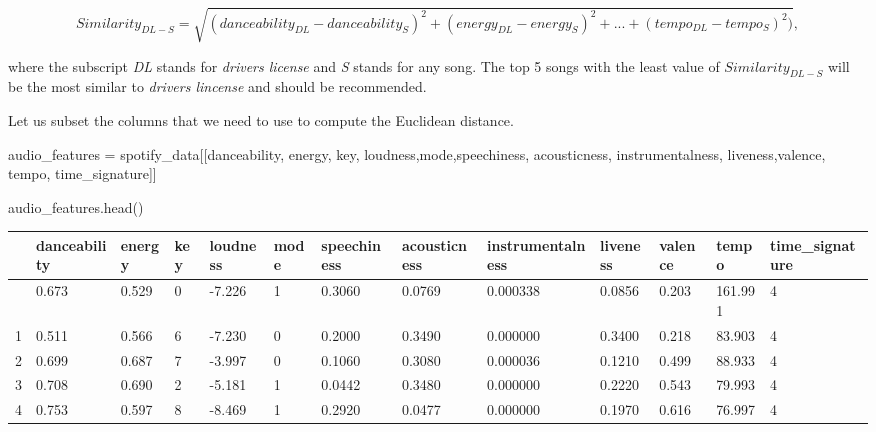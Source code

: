 \documentclass[
  letterpaper,
  DIV=11,
  numbers=noendperiod]{scrreprt}
\newenvironment{Shaded}{\begin{snugshade}}{\end{snugshade}}
\newcommand{\NormalTok}[1]{\textcolor[rgb]{0.00,0.23,0.31}{#1}}
\newcommand{\OperatorTok}[1]{\textcolor[rgb]{0.37,0.37,0.37}{#1}}
\newcommand{\StringTok}[1]{\textcolor[rgb]{0.13,0.47,0.30}{#1}}
\begin{document}
\[Similarity_{DL-S} = \sqrt{(danceability_{DL}-danceability_{S})^2+(energy_{DL}-energy_{S})^2 +...+ (tempo_{DL}-tempo_{S})^2)},\]

where the subscript \emph{DL} stands for \emph{drivers license} and
\emph{S} stands for any song. The top 5 songs with the least value of
\(Similarity_{DL-S}\) will be the most similar to \emph{drivers
lincense} and should be recommended.

Let us subset the columns that we need to use to compute the Euclidean
distance.

\begin{Shaded}
\begin{Highlighting}[]
\NormalTok{audio\_features }\OperatorTok{=}\NormalTok{ spotify\_data[[}\StringTok{\textquotesingle{}danceability\textquotesingle{}}\NormalTok{, }\StringTok{\textquotesingle{}energy\textquotesingle{}}\NormalTok{, }\StringTok{\textquotesingle{}key\textquotesingle{}}\NormalTok{, }\StringTok{\textquotesingle{}loudness\textquotesingle{}}\NormalTok{,}\StringTok{\textquotesingle{}mode\textquotesingle{}}\NormalTok{,}\StringTok{\textquotesingle{}speechiness\textquotesingle{}}\NormalTok{,}
                               \StringTok{\textquotesingle{}acousticness\textquotesingle{}}\NormalTok{, }\StringTok{\textquotesingle{}instrumentalness\textquotesingle{}}\NormalTok{, }\StringTok{\textquotesingle{}liveness\textquotesingle{}}\NormalTok{,}\StringTok{\textquotesingle{}valence\textquotesingle{}}\NormalTok{, }\StringTok{\textquotesingle{}tempo\textquotesingle{}}\NormalTok{, }\StringTok{\textquotesingle{}time\_signature\textquotesingle{}}\NormalTok{]]}
\end{Highlighting}
\end{Shaded}

\begin{Shaded}
\begin{Highlighting}[]
\NormalTok{audio\_features.head()}
\end{Highlighting}
\end{Shaded}

\begin{longtable}[]{@{}lllllllllllll@{}}
\toprule\noalign{}
& danceability & energy & key & loudness & mode & speechiness &
acousticness & instrumentalness & liveness & valence & tempo &
time\_signature \\
\midrule\noalign{}
\endhead
\bottomrule\noalign{}
\endlastfoot
0 & 0.673 & 0.529 & 0 & -7.226 & 1 & 0.3060 & 0.0769 & 0.000338 & 0.0856
& 0.203 & 161.991 & 4 \\
1 & 0.511 & 0.566 & 6 & -7.230 & 0 & 0.2000 & 0.3490 & 0.000000 & 0.3400
& 0.218 & 83.903 & 4 \\
2 & 0.699 & 0.687 & 7 & -3.997 & 0 & 0.1060 & 0.3080 & 0.000036 & 0.1210
& 0.499 & 88.933 & 4 \\
3 & 0.708 & 0.690 & 2 & -5.181 & 1 & 0.0442 & 0.3480 & 0.000000 & 0.2220
& 0.543 & 79.993 & 4 \\
4 & 0.753 & 0.597 & 8 & -8.469 & 1 & 0.2920 & 0.0477 & 0.000000 & 0.1970
& 0.616 & 76.997 & 4 \\
\end{longtable}
\end{document}
